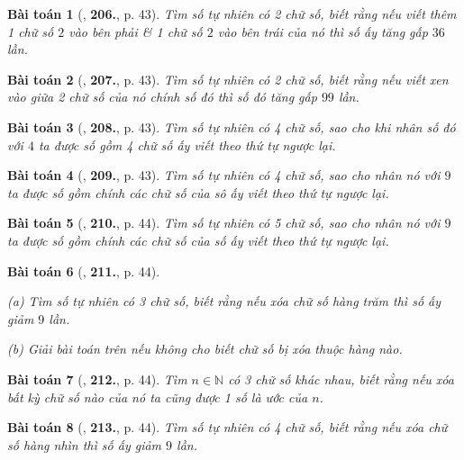\documentclass{article}
\numberwithin{equation}{section}
\newtheorem{baitoan}{Bài toán}[section]
\begin{document}
\begin{baitoan}[\cite{Binh_Toan_6_tap_1}, \textbf{206.}, p. 43]
	Tìm số tự nhiên có 2 chữ số, biết rằng nếu viết thêm 1 chữ số $2$ vào bên phải \& 1 chữ số $2$ vào bên trái của nó thì số ấy tăng gấp $36$ lần.
\end{baitoan}

\begin{baitoan}[\cite{Binh_Toan_6_tap_1}, \textbf{207.}, p. 43]
	Tìm số tự nhiên có 2 chữ số, biết rằng nếu viết xen vào giữa 2 chữ số của nó chính số đó thì số đó tăng gấp $99$ lần.
\end{baitoan}

\begin{baitoan}[\cite{Binh_Toan_6_tap_1}, \textbf{208.}, p. 43]
	Tìm số tự nhiên có 4 chữ số, sao cho khi nhân số đó với $4$ ta được số gồm 4 chữ số ấy viết theo thứ tự ngược lại.
\end{baitoan}

\begin{baitoan}[\cite{Binh_Toan_6_tap_1}, \textbf{209.}, p. 43]
	Tìm số tự nhiên có 4 chữ số, sao cho nhân nó với $9$ ta được số gồm chính các chữ số của sô ấy viết theo thứ tự ngược lại.
\end{baitoan}

\begin{baitoan}[\cite{Binh_Toan_6_tap_1}, \textbf{210.}, p. 44]
	Tìm số tự nhiên có 5 chữ số, sao cho nhân nó với $9$ ta được số gồm chính các chữ số của số ấy viết theo thứ tự ngược lại.
\end{baitoan}

\begin{baitoan}[\cite{Binh_Toan_6_tap_1}, \textbf{211.}, p. 44]
	\begin{enumerate*}
		\item[(a)] Tìm số tự nhiên có 3 chữ số, biết rằng nếu xóa chữ số hàng trăm thì số ấy giảm $9$ lần.
		\item[(b)] Giải bài toán trên nếu không cho biết chữ số bị xóa thuộc hàng nào.
	\end{enumerate*}
\end{baitoan}

\begin{baitoan}[\cite{Binh_Toan_6_tap_1}, \textbf{212.}, p. 44]
	Tìm $n\in\mathbb{N}$ có 3 chữ số khác nhau, biết rằng nếu xóa bất kỳ chữ số nào của nó ta cũng được 1 số là ước của $n$.	
\end{baitoan}

\begin{baitoan}[\cite{Binh_Toan_6_tap_1}, \textbf{213.}, p. 44]
	Tìm số tự nhiên có 4 chữ số, biết rằng nếu xóa chữ số hàng nhìn thì số ấy giảm $9$ lần.
\end{baitoan}
\end{document}
